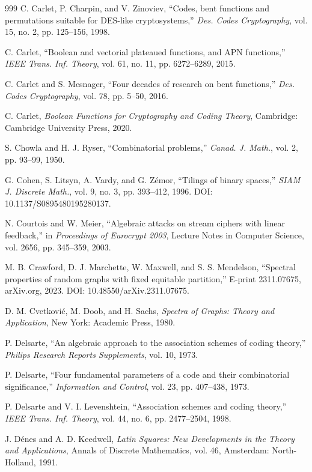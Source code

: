 \documentclass[11pt]{article}
\theoremstyle{definition}
\begin{document}
{{{\begin{thebibliography}{999}
C. Carlet, P. Charpin, and V. Zinoviev,
``Codes, bent functions and permutations suitable for DES-like cryptosystems,''
\textit{Des. Codes Cryptography}, vol. 15, no. 2, pp. 125--156, 1998.

C. Carlet,
``Boolean and vectorial plateaued functions, and APN functions,''
\textit{IEEE Trans. Inf. Theory}, vol. 61, no. 11, pp. 6272--6289, 2015.

C. Carlet and S. Mesnager,
``Four decades of research on bent functions,''
\textit{Des. Codes Cryptography}, vol. 78, pp. 5--50, 2016.

C. Carlet,
\textit{Boolean Functions for Cryptography and Coding Theory},
Cambridge: Cambridge University Press, 2020.

S. Chowla and H. J. Ryser,
``Combinatorial problems,''
\textit{Canad. J. Math.}, vol. 2, pp. 93--99, 1950.

G. Cohen, S. Litsyn, A. Vardy, and G. Zémor,
``Tilings of binary spaces,''
\textit{SIAM J. Discrete Math.}, vol. 9, no. 3, pp. 393--412, 1996.
DOI: 10.1137/S0895480195280137.

N. Courtois and W. Meier,
``Algebraic attacks on stream ciphers with linear feedback,''
in \textit{Proceedings of Eurocrypt 2003},
Lecture Notes in Computer Science, vol. 2656, pp. 345--359, 2003.

M. B. Crawford, D. J. Marchette, W. Maxwell, and S. S. Mendelson,
``Spectral properties of random graphs with fixed equitable partition,''
E-print 2311.07675, arXiv.org, 2023.
DOI: 10.48550/arXiv.2311.07675.

D. M. Cvetković, M. Doob, and H. Sachs,
\textit{Spectra of Graphs: Theory and Application},
New York: Academic Press, 1980.

P. Delsarte,
``An algebraic approach to the association schemes of coding theory,''
\textit{Philips Research Reports Supplements}, vol. 10, 1973.

P. Delsarte,
``Four fundamental parameters of a code and their combinatorial significance,''
\textit{Information and Control}, vol. 23, pp. 407--438, 1973.

P. Delsarte and V. I. Levenshtein,
``Association schemes and coding theory,''
\textit{IEEE Trans. Inf. Theory}, vol. 44, no. 6, pp. 2477--2504, 1998.

J. Dénes and A. D. Keedwell,
\textit{Latin Squares: New Developments in the Theory and Applications},
Annals of Discrete Mathematics, vol. 46,
Amsterdam: North-Holland, 1991.


\end{thebibliography}}}}
\end{document}
